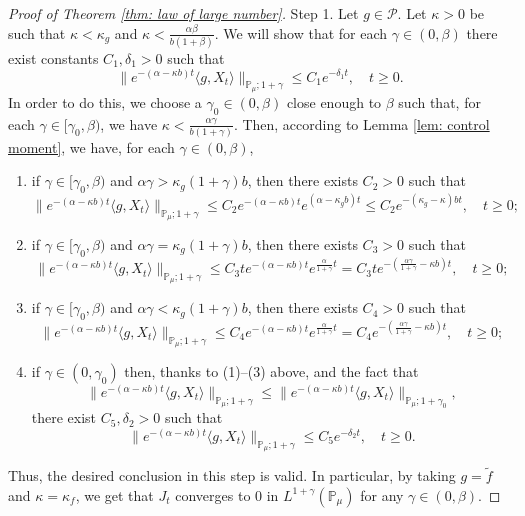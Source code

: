 \documentclass[12pt,a4paper]{amsart}
\theoremstyle{plain}
\theoremstyle{definition}
\numberwithin{equation}{section}
\begin{document}
\begin{proof}[Proof of Theorem \ref{thm: law of large number}]
	Step 1. Let $g\in \mathcal P$.
	Let $\kappa > 0$ be such that $\kappa < \kappa_g$ and $\kappa < \frac{\alpha \beta}{b(1+\beta)}$.
	We will show that for each $\gamma \in (0,\beta)$ there exist 
	constants $C_1,\delta_1 > 0$ such that
\[
	\|e^{-(\alpha - \kappa b)t} \langle g, X_t\rangle\|_{\mathbb P_\mu;1+\gamma}
	\leq C_1 e^{-\delta_1 t},
	\quad t\geq 0.
\]
	In order to do this, we choose a $\gamma_0 \in (0,\beta)$ close enough to $\beta$ such that, for each $\gamma \in [\gamma_0, \beta)$, we have $\kappa < \frac{\alpha\gamma}{b(1+\gamma)}$.
	Then, according to Lemma \ref{lem: control moment}, we have, for each $\gamma \in (0,\beta)$,
\begin{enumerate}
\item
	if $\gamma \in [\gamma_0, \beta)$ and $\alpha\gamma> \kappa_g (1+\gamma)b$, then there exists $C_2>0$ such that
\[
    \|e^{-(\alpha - \kappa b)t} \langle g, X_t\rangle\|_{\mathbb P_\mu;1+\gamma}
    \leq C_2 e^{-(\alpha-\kappa b)t}e^{(\alpha-\kappa_g b)t}
    \leq C_2  e^{-(\kappa_g - \kappa )bt},
    \quad t\geq 0;
\]
\item
	if $\gamma \in [\gamma_0, \beta)$ and $\alpha\gamma=\kappa_g(1+\gamma)b$, then there exists $C_3>0$ such that
\[
    \|e^{-(\alpha - \kappa b)t} \langle g, X_t\rangle\|_{\mathbb P_\mu;1+\gamma}
    \leq C_3 t e^{-(\alpha - \kappa b)t}e^{\frac{\alpha}{1+\gamma}t}
    = C_3 t e^{-(\frac{\alpha \gamma}{1+\gamma} - \kappa b)t},
    \quad t\geq 0;
\]
\item
	if $\gamma \in [\gamma_0, \beta)$ and $\alpha\gamma < \kappa_g (1+\gamma)b$, then there exists $C_4>0$ such that
\[
    \|e^{-(\alpha - \kappa b)t} \langle g, X_t\rangle\|_{\mathbb{P}_{\mu};1+\gamma}
    \leq C_4  e^{-(\alpha - \kappa b)t}e^{\frac{\alpha}{1+\gamma}t}
    = C_4  e^{-(\frac{\alpha \gamma}{1+\gamma} - \kappa b)t},
    \quad t\geq 0;
\]
\item
	if $\gamma \in (0,\gamma_0)$ then, thanks to (1)--(3) above, and the fact that \[\|e^{-(\alpha - \kappa b)t} \langle g, X_t\rangle\|_{\mathbb{P}_{\mu};1+\gamma}
	\leq \|e^{-(\alpha - \kappa b)t} \langle g, X_t\rangle\|_{\mathbb{P}_{\mu};1+\gamma_0},\] there exist $C_5, \delta_2 >0$ such that
\[
	\|e^{-(\alpha - \kappa b)t} \langle g, X_t\rangle\|_{\mathbb{P}_{\mu};1+\gamma}
	\leq C_5e^{-\delta_2 t},
	\quad t\geq 0.
\]
\end{enumerate}
	Thus, the desired conclusion in this step is valid.
	In particular, by taking $g = \tilde f$ and $\kappa = \kappa_f$, we get that $J_t$ converges to $0$ in $L^{1+\gamma}(\mathbb{P}_{\mu})$ for any $\gamma\in(0,\beta)$.


\end{proof}
\end{document}
